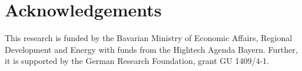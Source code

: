 \documentclass{article} %
\theoremstyle{plain}
\theoremstyle{definition}
\theoremstyle{remark}
\begin{document}
\section{Acknowledgements}
This research is funded by the Bavarian Ministry of Economic Affairs, Regional Development and Energy with funds from the Hightech Agenda Bayern. Further, it is supported by the German Research Foundation, grant GU 1409/4-1.




\clearpage


\end{document}
